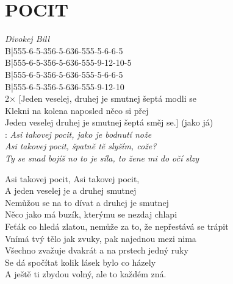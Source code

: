 \section*{\Huge POCIT}
\emph{Divokej Bill}\\

B|555-6-5-356-5-636-555-5-6-6-5\\
B|555-6-5-356-5-636-555-9-12-10-5\\
B|555-6-5-356-5-636-555-5-6-6-5\\
B|555-6-5-356-5-636-555-9-12-10\\

2$\times$ [Jeden veselej, druhej je smutnej šeptá modli se\\
Klekni na kolena naposled něco si přej\\
Jeden veselej druhej je smutnej šeptá směj se.] \hspace{1cm}(jako já)\\

\textregistered:
\emph{
Asi takovej pocit, jako je bodnutí nože\\
Asi takovej pocit, špatně tě slyším, cože?\\
Ty se snad bojíš no to je síla, to žene mi do očí slzy\\
}

Asi takovej pocit, Asi takovej pocit,\\

\textregistered \hspace{0.5cm} A jeden veselej je a druhej smutnej\\

\textregistered \hspace{0.5cm} Nemůžou se na to dívat a druhej je smutnej\\

Něco jako má buzík, kterýmu se nezdaj chlapi\\
Feťák co hledá zlatou, nemůže za to, že nepřestává se trápit\\
Vnímá tvý tělo jak zvuky, pak najednou mezi nima\\

Všechno zvažuje dvakrát a na prstech jedný ruky\\
Se dá spočítat kolik lásek bylo co házely\\
A ještě ti zbydou volný, ale to každém zná. \hspace{1cm} \textregistered

\newpage

